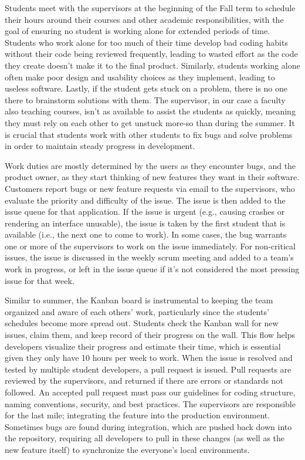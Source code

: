 Students meet with the supervisors at the beginning of the Fall term to schedule their hours around their courses and other academic responsibilities, with the goal of ensuring no student is working alone for extended periods of time. Students who work alone for too much of their time develop bad coding habits without their code being reviewed frequently, leading to wasted effort as the code they create doesn't make it to the final product. Similarly, students working alone often make poor design and usability choices as they implement, leading to useless software. Lastly, if the student gets stuck on a problem, there is no one there to brainstorm solutions with them. The supervisor, in our case a faculty also teaching courses, isn't as available to assist the students as quickly, meaning they must rely on each other to get unstuck more-so than during the summer. It is crucial that students work with other students to fix bugs and solve problems in order to maintain steady progress in development.

Work duties are mostly determined by the users as they encounter bugs, and the product owner, as they start thinking of new features they want in their software. Customers report bugs or new feature requests via email to the supervisors, who evaluate the priority and difficulty of the issue. The issue is then added to the issue queue for that application. If the issue is urgent (e.g., causing crashes or rendering an interface unusable), the issue is taken by the first student that is available (i.e., the next one to come to work). In some cases, the bug warrants one or more of the supervisors to work on the issue immediately. For non-critical issues, the issue is discussed in the weekly scrum meeting and added to a team's work in progress, or left in the issue queue if it's not considered the most pressing issue for that week.

Similar to summer, the Kanban board is instrumental to keeping the team organized and aware of each others' work, particularly since the students' schedules become more spread out. Students check the Kanban wall for new issues, claim them, and keep record of their progress on the wall. This flow helps developers visualize their progress and estimate their time, which is essential given they only have 10 hours per week to work. When the issue is resolved and tested by multiple student developers, a pull request is issued. Pull requests are reviewed by the supervisors, and returned if there are errors or standards not followed. An accepted pull request must pass our guidelines for coding structure, naming conventions, security, and best practices. The supervisors are responsible for the last mile; integrating the feature into the production environment. Sometimes bugs are found during integration, which are pushed back down into the repository, requiring all developers to pull in these changes (as well as the new feature itself) to synchronize the everyone's local environments.


